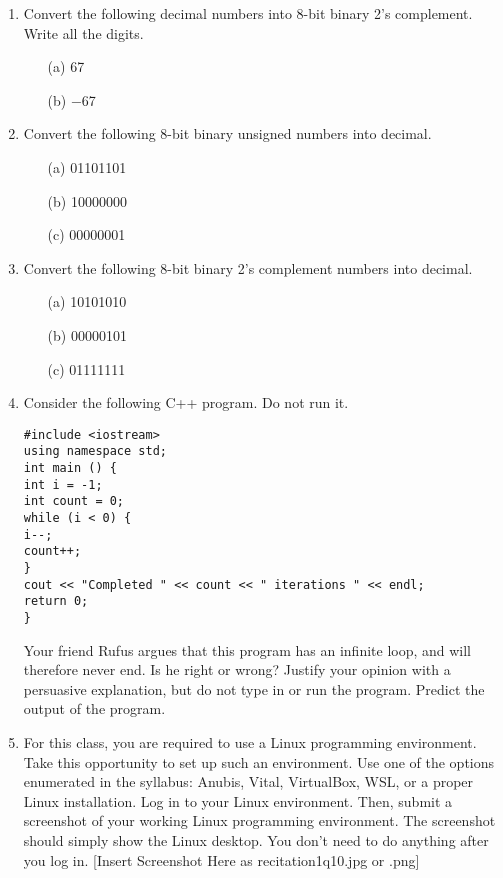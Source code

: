 \documentclass{article}
\begin{document}
\begin{enumerate}
    \item Convert the following decimal numbers into 8-bit binary 2’s complement. Write all the digits.
    \begin{itemize}
        \item[(a)] 67
        \item[(b)] −67
    \end{itemize}

    \item Convert the following 8-bit binary unsigned numbers into decimal.
    \begin{itemize}
        \item[(a)] 01101101
        \item[(b)] 10000000
        \item[(c)] 00000001
    \end{itemize}

    \item Convert the following 8-bit binary 2’s complement numbers into decimal.
    \begin{itemize}
        \item[(a)] 10101010
        \item[(b)] 00000101
        \item[(c)] 01111111
    \end{itemize}
    \item Consider the following C++ program. Do not run it.
    \begin{verbatim}
#include <iostream>
using namespace std;
int main () {
int i = -1;
int count = 0;
while (i < 0) {
i--;
count++;
}
cout << "Completed " << count << " iterations " << endl;
return 0;
}
    \end{verbatim}
    Your friend Rufus argues that this program has an infinite loop, and will therefore never end. Is he right or wrong? Justify your opinion with a persuasive explanation, but do not type in or run the program. Predict the output of the program.


    \item For this class, you are required to use a Linux programming environment. Take this opportunity to set up such an environment. Use one of the options enumerated in the syllabus: Anubis, Vital, VirtualBox, WSL, or a proper Linux installation.
    Log in to your Linux environment. Then, submit a screenshot of your working Linux programming environment. The screenshot should simply show the Linux desktop. You don’t need to do anything after you log in. [Insert Screenshot Here as recitation1q10.jpg or .png]


\end{enumerate}
\end{document}
